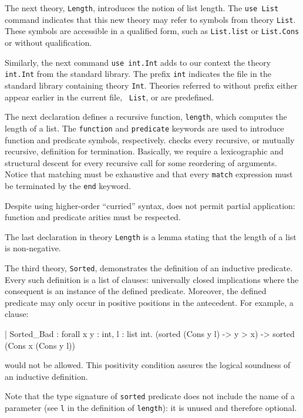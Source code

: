 The next theory, \texttt{Length}, introduces the notion of list
length. The \texttt{use List} command indicates that this new
theory may refer to symbols from theory \texttt{List}. These symbols
are accessible in a qualified form, such as \texttt{List.list} or
\texttt{List.Cons} or without qualification.

Similarly, the next command \texttt{use int.Int} adds to our
context the theory \texttt{int.Int} from the standard library. The
prefix \texttt{int} indicates the file in the standard library
containing theory \texttt{Int}. Theories referred to without prefix
either appear earlier in the current file, \eg\ \texttt{List}, or are
predefined.

The next declaration defines a recursive function, \texttt{length},
which computes the length of a list. The \texttt{function} and
\texttt{predicate} keywords are used to introduce function and
predicate symbols, respectively.
\why checks every recursive, or mutually recursive, definition for
termination. Basically, we require a lexicographic and structural
descent for every recursive call for some reordering of arguments.
Notice that matching must be exhaustive and that every \texttt{match}
expression must be terminated by the \texttt{end} keyword.

Despite using higher-order ``curried'' syntax, \why does not permit
partial application: function and predicate arities must be respected.

The last declaration in theory \texttt{Length} is a lemma stating that
the length of a list is non-negative.

The third theory, \texttt{Sorted}, demonstrates the definition of
an inductive predicate. Every such definition is a list of clauses:
universally closed implications where the consequent is an instance
of the defined predicate. Moreover, the defined predicate may only
occur in positive positions in the antecedent. For example, a clause:
\begin{whycode}
  | Sorted_Bad :
      forall x y : int, l : list int.
      (sorted (Cons y l) -> y > x) -> sorted (Cons x (Cons y l))
\end{whycode}
would not be allowed. This positivity condition assures the logical
soundness of an inductive definition.

Note that the type signature of \lstinline{sorted} predicate does not
include the name of a parameter (see \texttt{l} in the definition
of \texttt{length}): it is unused and therefore optional.

